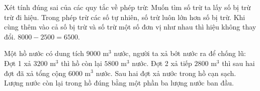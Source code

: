 \begin{ex} %
Xét tính đúng sai của các quy tắc về phép trừ:
\choiceTF
{\True Muốn tìm số trừ ta lấy số bị trừ trừ đi hiệu.}
{Trong phép trừ các số tự nhiên, số trừ luôn lớn hơn số bị trừ.}
{\True Khi cùng thêm vào cả số bị trừ và số trừ một số đơn vị như nhau thì hiệu không thay đổi.}
{$8000 - 2500 = 6500$.}
\end{ex}

\begin{ex} %
Một hồ nước có dung tích $9000\text{ m}^3$ nước, người ta xả bớt nước ra để chống lũ:
\choiceTF
{\True Đợt 1 xả $3200\text{ m}^3$ thì hồ còn lại $5800\text{ m}^3$ nước.}
{\True Đợt 2 xả tiếp $2800\text{ m}^3$ thì sau hai đợt đã xả tổng cộng $6000\text{ m}^3$ nước.}
{Sau hai đợt xả nước trong hồ cạn sạch.}
{\True Lượng nước còn lại trong hồ đúng bằng một phần ba lượng nước ban đầu.}
\end{ex}

